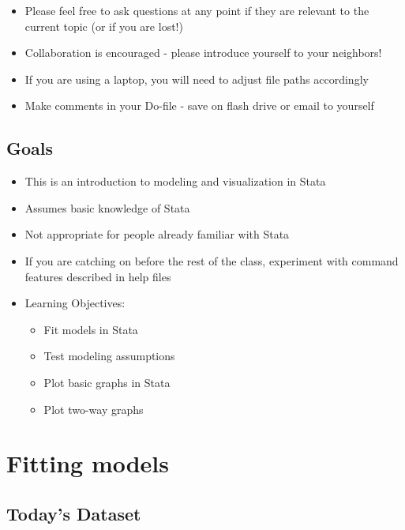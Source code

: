\documentclass[
]{book}
\providecommand{\tightlist}{%
  \setlength{\itemsep}{0pt}\setlength{\parskip}{0pt}}
\begin{document}
\begin{itemize}
\tightlist
\item
  Please feel free to ask questions at any point if they are relevant to the current topic (or if you are lost!)
\item
  Collaboration is encouraged - please introduce yourself to your neighbors!
\item
  If you are using a laptop, you will need to adjust file paths accordingly
\item
  Make comments in your Do-file - save on flash drive or email to yourself
\end{itemize}

\hypertarget{goals-5}{%
\subsection{Goals}\label{goals-5}}

\begin{itemize}
\tightlist
\item
  This is an introduction to modeling and visualization in Stata
\item
  Assumes basic knowledge of Stata
\item
  Not appropriate for people already familiar with Stata
\item
  If you are catching on before the rest of the class, experiment with command features described in help files
\item
  Learning Objectives:

  \begin{itemize}
  \tightlist
  \item
    Fit models in Stata
  \item
    Test modeling assumptions
  \item
    Plot basic graphs in Stata
  \item
    Plot two-way graphs
  \end{itemize}
\end{itemize}

\hypertarget{fitting-models}{%
\section{Fitting models}\label{fitting-models}}

\hypertarget{todays-dataset}{%
\subsection{Today's Dataset}\label{todays-dataset}}
\end{document}

